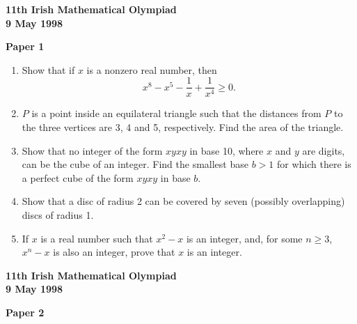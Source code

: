 \documentclass[12pt]{article}
\begin{document}
\begin{center}
{\large\bfseries 11th Irish Mathematical Olympiad\\9 May 1998}
\end{center}
\bigskip\noindent\textbf{Paper 1}\bigskip
\begin{enumerate}
\item Show that if $x$ is a nonzero real number, then
\[
x^8 - x^5 - \frac{1}{x} + \frac{1}{x^4} \geq 0.
\]

\item $P$ is a point inside an equilateral triangle such that the distances from $P$ to the three vertices are 3, 4 and 5, respectively. Find the area of the triangle.

\item Show that no integer of the form $xyxy$ in base 10, where $x$ and $y$ are digits, can be the cube of an integer.
Find the smallest base $b > 1$ for which there is a perfect cube of the form $xyxy$ in base $b$.

\item Show that a disc of radius 2 can be covered by seven (possibly overlapping) discs of radius 1.

\item If $x$ is a real number such that $x^2 - x$ is an integer, and, for some $n \geq 3$, $x^n - x$ is also an integer, prove that $x$ is an integer.

\end{enumerate}
\newpage
\begin{center}
{\large\bfseries 11th Irish Mathematical Olympiad\\9 May 1998}
\end{center}
\bigskip\noindent\textbf{Paper 2}\bigskip
\end{document}
